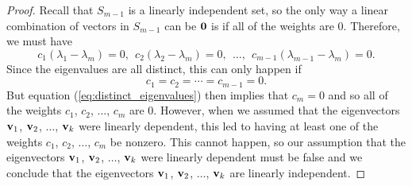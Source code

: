 \begin{proof}
Recall that $S_{m-1}$ is a linearly independent set, so the only way a linear combination of vectors in $S_{m-1}$ can be $\mathbf{0}$ is if all of the weights are 0. Therefore, we must have
\[c_{1}(\lambda_{1}-\lambda_m) = 0, \ \ c_{2}(\lambda_{2}-\lambda_m) = 0, \ \ \ldots, \ \ c_{m-1} (\lambda_{m-1}-\lambda_m) = 0.\]
Since the eigenvalues are all distinct, this can only happen if
\[c_1 = c_2 = \cdots = c_{m-1} = 0.\]
But equation (\ref{eq:distinct_eigenvalues}) then implies that $c_m = 0$ and so all of the weights $c_1$, $c_2$, $\ldots$, $c_m$ are 0. However, when we assumed that the eigenvectors $\mathbf{v}_1$, $\mathbf{v}_2$, $\ldots$, $\mathbf{v}_k$ were linearly dependent, this led to having at least one of the weights $c_1$, $c_2$, $\ldots$, $c_m$ be nonzero. This cannot happen, so our assumption that the eigenvectors $\mathbf{v}_1$, $\mathbf{v}_2$, $\ldots$, $\mathbf{v}_k$ were linearly dependent must be false and we conclude that the eigenvectors $\mathbf{v}_1$, $\mathbf{v}_2$, $\ldots$, $\mathbf{v}_k$ are linearly independent.
\end{proof}




\ExampleIntro

